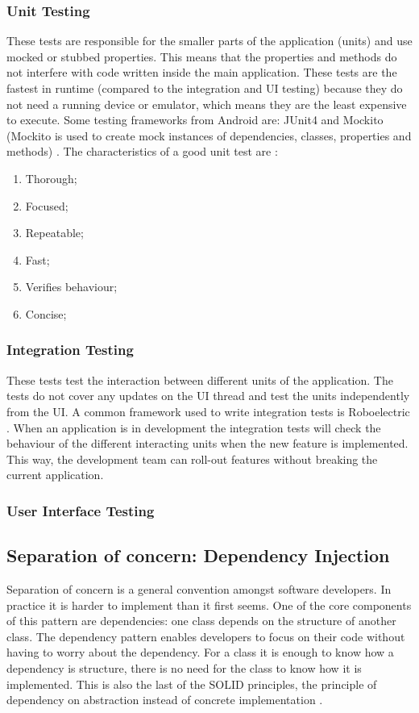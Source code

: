 \subsubsection{Unit Testing}
These tests are responsible for the smaller parts of the application (units) and use mocked or stubbed properties. This means that the properties and methods do not interfere with code written inside the main application. These tests are the fastest in runtime (compared to the integration and UI testing) because they do not need a running device or emulator, which means they are the least expensive to execute. Some testing frameworks from Android are: JUnit4 and Mockito (Mockito is used to create mock instances of dependencies, classes, properties and methods) \cite{FernandoSproviero2018}. The characteristics of a good unit test are \cite{Google_testing2017}:
\begin{enumerate}
\item Thorough;
\item Focused;
\item Repeatable;
\item Fast;
\item Verifies behaviour;
\item Concise;
\end{enumerate}
\subsubsection{Integration Testing}
These tests test the interaction between different units of the application. The tests do not cover any updates on the UI thread and test the units independently from the UI. A common framework used to write integration tests is Roboelectric \cite{Roboelec2019}. When an application is in development the integration tests will check the behaviour of the different interacting units when the new feature is implemented. This way, the development team can roll-out features without breaking the current application.
\subsubsection{User Interface Testing}
\subsection{Separation of concern: Dependency Injection}
Separation of concern is a general convention amongst software developers. In practice it is harder to implement than it first seems. One of the core components of this pattern are dependencies: one class depends on the structure of another class. The dependency pattern enables developers to focus on their code without having to worry about the dependency. For a class it is enough to know how a dependency is structure, there is no need for the class to know how it is implemented. This is also the last of the SOLID principles, the principle of dependency on abstraction instead of concrete implementation \cite{BhavyaKaria2018}.
